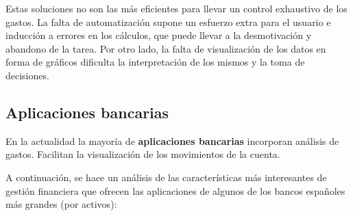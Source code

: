 Estas soluciones no son las más eficientes para llevar un control exhaustivo de los gastos. La falta de automatización supone un esfuerzo extra para el usuario e inducción a errores en los cálculos, que puede llevar a la desmotivación y abandono de la tarea. Por otro lado, la falta de visualización de 
los datos en forma de gráficos dificulta la interpretación de los mismos y la toma de decisiones.

\subsection{Aplicaciones bancarias}
En la actualidad la mayoría de \textbf{aplicaciones bancarias} incorporan análisis de gastos. 
Facilitan la visualización de los movimientos de la cuenta. 

A continuación, se hace un análisis de las características más interesantes de gestión financiera que ofrecen las aplicaciones de algunos de los bancos españoles más grandes (por activos)\cite{articulo-bancos}:

